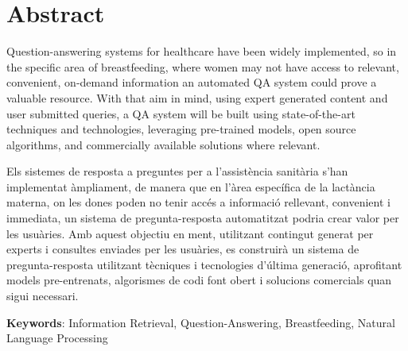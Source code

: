 



\chapter*{Abstract}

\onehalfspacing

Question-answering systems for healthcare have been widely implemented, so in the specific area of breastfeeding, where women may not have access to relevant, convenient, on-demand information an automated QA system could prove a valuable resource. With that aim in mind, using expert generated content and user submitted queries, a QA system will be built using state-of-the-art techniques and technologies, leveraging pre-trained models, open source algorithms, and commercially available solutions where relevant. 

\vspace{1.5cm}

Els sistemes de resposta a preguntes per a l'assistència sanitària s'han implementat àmpliament, de manera que en l'àrea específica de la lactància materna, on les dones poden no tenir accés a informació rellevant, convenient i immediata, un sistema de pregunta-resposta automatitzat podria crear valor per les usuàries. Amb aquest objectiu en ment, utilitzant contingut generat per experts i consultes enviades per les usuàries, es construirà un sistema de pregunta-resposta utilitzant tècniques i tecnologies d'última generació, aprofitant models pre-entrenats, algorismes de codi font obert i solucions comercials quan sigui necessari.
\vspace{1.5cm}

\textbf{Keywords}: Information Retrieval, Question-Answering, Breastfeeding, Natural Language Processing